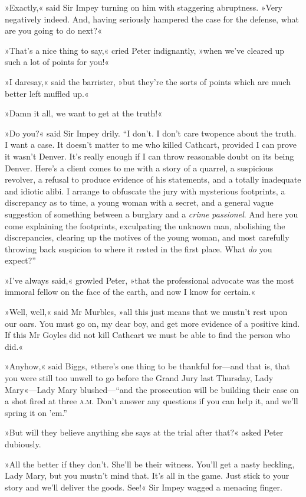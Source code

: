 »Exactly,« said Sir Impey turning on him with staggering abruptness.  »Very negatively indeed. And, having seriously hampered the case for the defense, what are you going to do next?«

»That's a nice thing to say,« cried Peter indignantly, »when we've cleared up such a lot of points for you!«

»I daresay,« said the barrister, »but they're the sorts of points which are much better left muffled up.«

»Damn it all, we want to get at the truth!«

»Do you?« said Sir Impey drily. \enquote{I don't. I don't care twopence about the truth. I want a case. It doesn't matter to me who killed Cathcart, provided I can prove it wasn't Denver. It's really enough if I can throw reasonable doubt on its being Denver. Here's a client comes to me with a story of a quarrel, a suspicious revolver, a refusal to produce evidence of his statements, and a totally inadequate and idiotic alibi. I arrange to obfuscate the jury with mysterious footprints, a discrepancy as to time, a young woman with a secret, and a general vague suggestion of something between a burglary and a \textit{crime passionel}. And here you come explaining the footprints, exculpating the unknown man, abolishing the discrepancies, clearing up the motives of the young woman, and most carefully throwing back suspicion to where it rested in the first place. What \textit{do} you expect?}

»I've always said,« growled Peter, »that the professional advocate was the most immoral fellow on the face of the earth, and now I know for certain.«

»Well, well,« said Mr Murbles, »all this just means that we mustn't rest upon our oars. You must go on, my dear boy, and get more evidence of a positive kind. If this Mr Goyles did not kill Cathcart we must be able to find the person who did.«

»Anyhow,« said Biggs, »there's one thing to be thankful for\allowbreak---\allowbreak and that is, that you were still too unwell to go before the Grand Jury last Thursday, Lady Mary«---Lady Mary blushed---\enquote{and the prosecution will be building their case on a shot fired at three \textsc{a.m.} Don't answer any questions if you can help it, and we'll spring it on 'em.}

»But will they believe anything she says at the trial after that?« asked Peter dubiously.

»All the better if they don't. She'll be their witness. You'll get a nasty heckling, Lady Mary, but you mustn't mind that. It's all in the game. Just stick to your story and we'll deliver the goods. See!« Sir Impey wagged a menacing finger.

